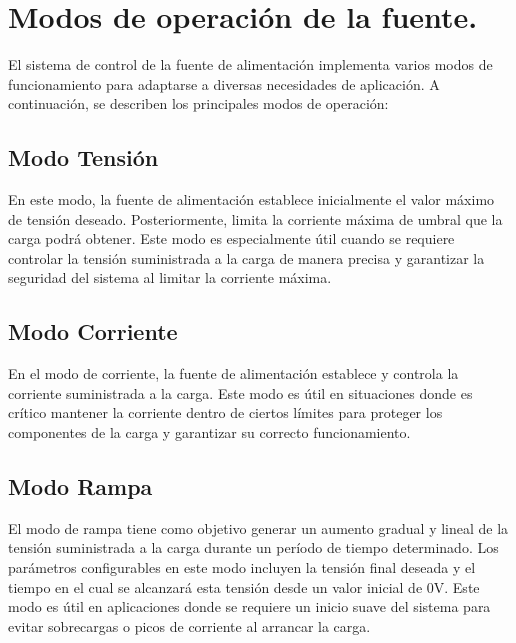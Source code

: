 \section{Modos de operación de la fuente.}
El sistema de control de la fuente de alimentación implementa varios modos de funcionamiento para adaptarse a diversas necesidades de aplicación. A continuación, se describen los principales modos de operación: \par 
\subsection{Modo Tensión}
En este modo, la fuente de alimentación establece inicialmente el valor máximo de tensión deseado. Posteriormente, limita la corriente máxima de umbral que la carga podrá obtener. Este modo es especialmente útil cuando se requiere controlar la tensión suministrada a la carga de manera precisa y garantizar la seguridad del sistema al limitar la corriente máxima.\par 
\subsection{Modo Corriente}
En el modo de corriente, la fuente de alimentación establece y controla la corriente suministrada a la carga. Este modo es útil en situaciones donde es crítico mantener la corriente dentro de ciertos límites para proteger los componentes de la carga y garantizar su correcto funcionamiento.\par 
\subsection{Modo Rampa}
El modo de rampa tiene como objetivo generar un aumento gradual y lineal de la tensión suministrada a la carga durante un período de tiempo determinado. Los parámetros configurables en este modo incluyen la tensión final deseada y el tiempo en el cual se alcanzará esta tensión desde un valor inicial de 0V. Este modo es útil en aplicaciones donde se requiere un inicio suave del sistema para evitar sobrecargas o picos de corriente al arrancar la carga.\par 
